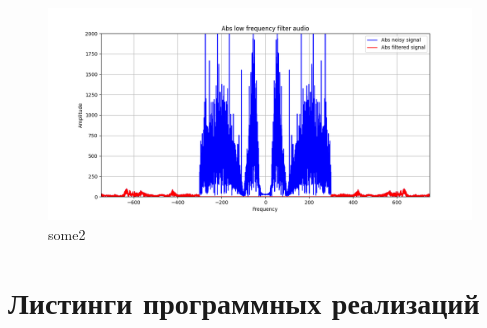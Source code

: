 \documentclass[a4paper, 12pt]{article}
\begin{document}
    \begin{figure}[!htb]
        \centering
        \includegraphics[scale=0.485]{abs_u_U_audio.png}
        \captionsetup{skip=0pt}
        \caption{some2}
        \label{fig:fig114}
    \end{figure}


    \section{Листинги программных реализаций}
\end{document}
